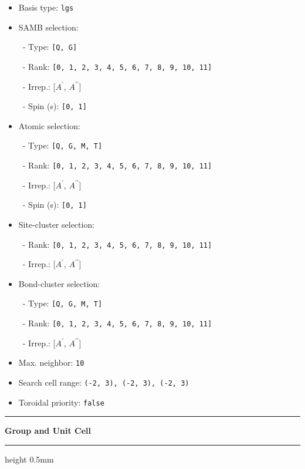 \documentclass[fleqn,10pt,landscape]{jsarticle}
\begin{document}
\begin{itemize}
\item Basis type: \texttt{lgs}

\item SAMB selection:

\, - Type: \texttt{[Q, G]}

\, - Rank: \texttt{[0, 1, 2, 3, 4, 5, 6, 7, 8, 9, 10, 11]}

\, - Irrep.: [$A^{\prime}$, $A^{\prime\prime}$]

\, - Spin (s): \texttt{[0, 1]}

\item Atomic selection:

\, - Type: \texttt{[Q, G, M, T]}

\, - Rank: \texttt{[0, 1, 2, 3, 4, 5, 6, 7, 8, 9, 10, 11]}

\, - Irrep.: [$A^{\prime}$, $A^{\prime\prime}$]

\, - Spin (s): \texttt{[0, 1]}

\item Site-cluster selection:

\, - Rank: \texttt{[0, 1, 2, 3, 4, 5, 6, 7, 8, 9, 10, 11]}

\, - Irrep.: [$A^{\prime}$, $A^{\prime\prime}$]

\item Bond-cluster selection:

\, - Type: \texttt{[Q, G, M, T]}

\, - Rank: \texttt{[0, 1, 2, 3, 4, 5, 6, 7, 8, 9, 10, 11]}

\, - Irrep.: [$A^{\prime}$, $A^{\prime\prime}$]

\item Max. neighbor: \texttt{10}

\item Search cell range: \texttt{(-2, 3), (-2, 3), (-2, 3)}

\item Toroidal priority: \texttt{false}

\end{itemize}
\vspace{5mm}
\noindent \rule[0.5mm]{5mm}{0.5mm}\hspace{3mm}\textbf{Group and Unit Cell}\hspace{3mm}\leaders\hrule height 0.5mm\hfill\kern0pt
\vspace{3mm}
\end{document}

